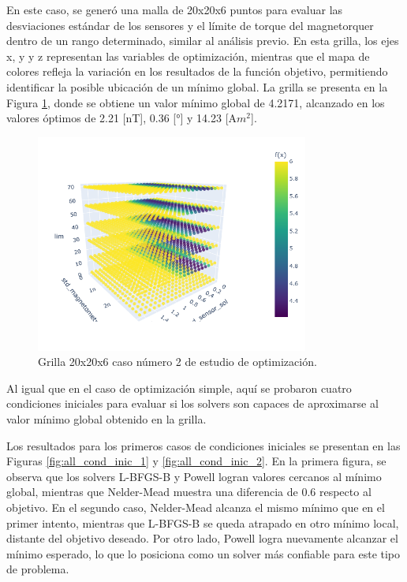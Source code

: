 En este caso, se generó una malla de 20x20x6 puntos para evaluar las desviaciones estándar de los sensores y el límite de torque del magnetorquer dentro de un rango determinado, similar al análisis previo. En esta grilla, los ejes x, y y z representan las variables de optimización, mientras que el mapa de colores refleja la variación en los resultados de la función objetivo, permitiendo identificar la posible ubicación de un mínimo global. La grilla se presenta en la Figura \ref{fig:f_grilla4d}, donde se obtiene un valor mínimo global de 4.2171, alcanzado en los valores óptimos de 2.21 [nT], 0.36 [°] y 14.23 [A$m^{2}$].

\begin{figure}[h]
	\centering    
	\includegraphics[width=0.8\textwidth]{SAboth2_typeact0_typerendall.png}
	\caption{Grilla 20x20x6 caso número 2 de estudio de optimización.}
	\label{fig:f_grilla4d}
\end{figure}	

Al igual que en el caso de optimización simple, aquí se probaron cuatro condiciones iniciales para evaluar si los solvers son capaces de aproximarse al valor mínimo global obtenido en la grilla.

Los resultados para los primeros casos de condiciones iniciales se presentan en las Figuras \ref{fig:all_cond_inic_1} y \ref{fig:all_cond_inic_2}. En la primera figura, se observa que los solvers L-BFGS-B y Powell logran valores cercanos al mínimo global, mientras que Nelder-Mead muestra una diferencia de 0.6 respecto al objetivo. En el segundo caso, Nelder-Mead alcanza el mismo mínimo que en el primer intento, mientras que L-BFGS-B se queda atrapado en otro mínimo local, distante del objetivo deseado. Por otro lado, Powell logra nuevamente alcanzar el mínimo esperado, lo que lo posiciona como un solver más confiable para este tipo de problema.

